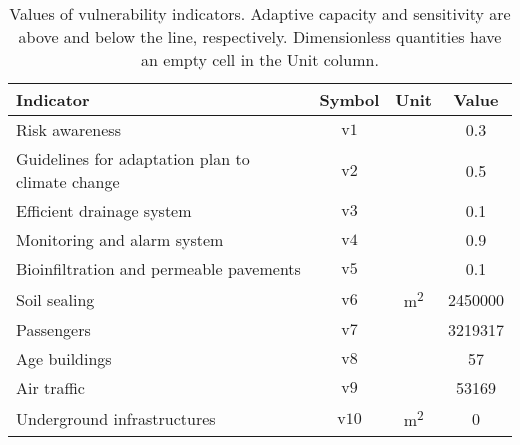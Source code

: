 \begin{table}
  \renewcommand*{\arraystretch}{1.5}
  \centering
  \caption{Values of vulnerability indicators. Adaptive capacity and sensitivity are above and below the line, respectively. Dimensionless quantities have an empty cell in the Unit column.}
  \label{tab:values_vulnerability}
  \begin{tabular}{p{}ccc}
    Indicator                                        & Symbol         & Unit                 & Value   \\
    \hline
    Risk awareness                                   & $\mathrm{v1}$  &                      & 0.3     \\
    Guidelines for adaptation plan to climate change & $\mathrm{v2}$  &                      & 0.5     \\
    Efficient drainage system                        & $\mathrm{v3}$  &                      & 0.1     \\
    Monitoring and alarm system                      & $\mathrm{v4}$  &                      & 0.9     \\
    Bioinfiltration and permeable pavements          & $\mathrm{v5}$  &                      & 0.1     \\
    \hline
    Soil sealing                                     & $\mathrm{v6}$  & \unit{\square\metre} & 2450000 \\
    Passengers                                       & $\mathrm{v7}$  &                      & 3219317 \\
    Age buildings                                    & $\mathrm{v8}$  &                      & 57      \\
    Air traffic                                      & $\mathrm{v9}$  &                      & 53169   \\
    Underground infrastructures                      & $\mathrm{v10}$ & \unit{\square\metre} & 0       \\
    \end{tabular}
\end{table}
